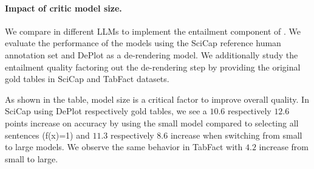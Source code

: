 \paragraph{Impact of critic model size.}%
We compare  in  different LLMs to implement the entailment component of \metric{}.
We evaluate the performance of the models using the SciCap reference human annotation set and DePlot as a de-rendering model. We additionally study the entailment quality factoring out the de-rendering step by providing the original gold tables in SciCap and TabFact datasets.

As shown in the table, model size is a critical factor to improve \metric{} overall quality. In SciCap using DePlot respectively gold tables, we  see a $10.6$ respectively $12.6$ points increase on accuracy by using the small model compared to selecting all sentences (f(x)=1) and $11.3$ respectively $8.6$ increase when switching from small to large models. We observe the same behavior in TabFact with $4.2$ increase from small to large.

